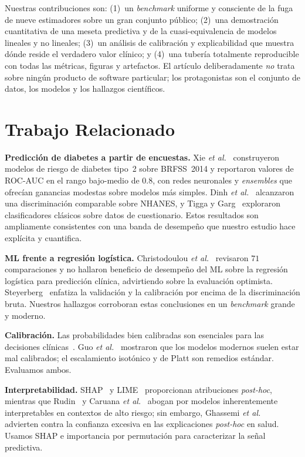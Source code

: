 \documentclass[conference]{IEEEtran}
\begin{document}
Nuestras contribuciones son: (1)~un \emph{benchmark} uniforme y consciente de la fuga de
nueve estimadores sobre un gran conjunto público; (2)~una demostración cuantitativa de una
meseta predictiva y de la cuasi-equivalencia de modelos lineales y no lineales; (3)~un
análisis de calibración y explicabilidad que muestra dónde reside el verdadero valor
clínico; y (4)~una tubería totalmente reproducible con todas las métricas, figuras y
artefactos. El artículo deliberadamente \emph{no} trata sobre ningún producto de software
particular; los protagonistas son el conjunto de datos, los modelos y los hallazgos
científicos.

\section{Trabajo Relacionado}
\textbf{Predicción de diabetes a partir de encuestas.} Xie \emph{et
al.}~\cite{xie2019building} construyeron modelos de riesgo de diabetes tipo~2 sobre
BRFSS~2014 y reportaron valores de ROC-AUC en el rango bajo-medio de $0.8$, con redes
neuronales y \emph{ensembles} que ofrecían ganancias modestas sobre modelos más simples.
Dinh \emph{et al.}~\cite{dinh2019data} alcanzaron una discriminación comparable sobre
NHANES, y Tigga y Garg~\cite{tigga2020prediction} exploraron clasificadores clásicos sobre
datos de cuestionario. Estos resultados son ampliamente consistentes con una banda de
desempeño que nuestro estudio hace explícita y cuantifica.

\textbf{ML frente a regresión logística.} Christodoulou \emph{et
al.}~\cite{christodoulou2019systematic} revisaron $71$ comparaciones y no hallaron
beneficio de desempeño del ML sobre la regresión logística para predicción clínica,
advirtiendo sobre la evaluación optimista. Steyerberg~\cite{steyerberg2019validation}
enfatiza la validación y la calibración por encima de la discriminación bruta. Nuestros
hallazgos corroboran estas conclusiones en un \emph{benchmark} grande y moderno.

\textbf{Calibración.} Las probabilidades bien calibradas son esenciales para las decisiones
clínicas~\cite{vancalster2019calibration,niculescu2005predicting}. Guo \emph{et
al.}~\cite{guo2017calibration} mostraron que los modelos modernos suelen estar mal
calibrados; el escalamiento isotónico y de Platt son remedios estándar. Evaluamos ambos.

\textbf{Interpretabilidad.} SHAP~\cite{lundberg2017shap,lundberg2020local} y
LIME~\cite{ribeiro2016lime} proporcionan atribuciones \emph{post-hoc}, mientras que
Rudin~\cite{rudin2019stop} y Caruana \emph{et al.}~\cite{caruana2015intelligible} abogan por
modelos inherentemente interpretables en contextos de alto riesgo; sin embargo, Ghassemi
\emph{et al.}~\cite{ghassemi2021false} advierten contra la confianza excesiva en las
explicaciones \emph{post-hoc} en salud. Usamos SHAP e importancia por permutación para
caracterizar la señal predictiva.
\end{document}
